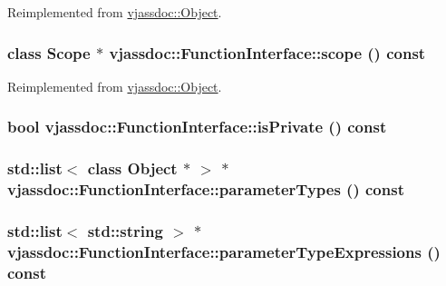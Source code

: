 Reimplemented from \hyperlink{classvjassdoc_1_1Object_cc4241505c5bcdd0bbcb08a1b665b3fd}{vjassdoc::Object}.\hypertarget{classvjassdoc_1_1FunctionInterface_3d298257fab6e122f44f07225ee3ab63}{
\subsubsection{\setlength{\rightskip}{0pt plus 5cm}class {\bf Scope} $\ast$ vjassdoc::FunctionInterface::scope () const}}
\label{classvjassdoc_1_1FunctionInterface_3d298257fab6e122f44f07225ee3ab63}




Reimplemented from \hyperlink{classvjassdoc_1_1Object_0738d05b196cc8b9e89d62839d81fc20}{vjassdoc::Object}.\hypertarget{classvjassdoc_1_1FunctionInterface_8b81d3aee374ba63043fcc06ec2eec1e}{
\subsubsection{\setlength{\rightskip}{0pt plus 5cm}bool vjassdoc::FunctionInterface::isPrivate () const}}
\label{classvjassdoc_1_1FunctionInterface_8b81d3aee374ba63043fcc06ec2eec1e}


\hypertarget{classvjassdoc_1_1FunctionInterface_fee3dfa7efa4bf0d40b27155cdfa3089}{
\subsubsection{\setlength{\rightskip}{0pt plus 5cm}std::list$<$ class {\bf Object} $\ast$ $>$ $\ast$ vjassdoc::FunctionInterface::parameterTypes () const}}
\label{classvjassdoc_1_1FunctionInterface_fee3dfa7efa4bf0d40b27155cdfa3089}


\hypertarget{classvjassdoc_1_1FunctionInterface_5a4199aa5d1aae02b27bb41d76e2dc70}{
\subsubsection{\setlength{\rightskip}{0pt plus 5cm}std::list$<$ std::string $>$ $\ast$ vjassdoc::FunctionInterface::parameterTypeExpressions () const}}
\label{classvjassdoc_1_1FunctionInterface_5a4199aa5d1aae02b27bb41d76e2dc70}



